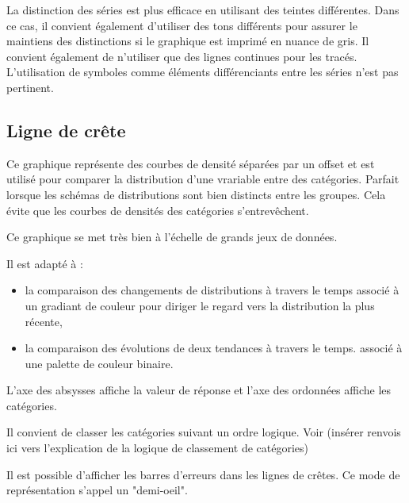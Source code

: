 \documentclass[a4paper,12pt]{article}
\begin{document}
\begin{multicols}{2}
La distinction des séries est plus efficace en utilisant des teintes différentes. Dans ce cas, il convient également d'utiliser des tons différents pour assurer le maintiens des distinctions si le graphique est imprimé en nuance de gris. \autocite{stephenfewComponentlevelGraphDesign2012}
Il convient également de n'utiliser que des lignes continues pour les tracés. \autocite{stephenfewComponentlevelGraphDesign2012}
L'utilisation de symboles comme éléments différenciants entre les séries n'est pas pertinent. \autocite{stephenfewComponentlevelGraphDesign2012}
\subsection*{Ligne de crête}
\label{sec:orgbbec5df}
Ce graphique représente des courbes de densité séparées par un offset et est utilisé pour comparer la distribution d'une vrariable entre des catégories. \autocite{wilkeVisualizingManyDistributions2019} Parfait lorsque les schémas de distributions sont bien distincts entre les groupes. \autocite{mikeyiHowChooseRight2020} Cela évite que les courbes de densités des catégories s'entrevêchent.\autocite{jonathanschwabishDistribution2021}

Ce graphique se met très bien à l'échelle de grands jeux de données. \autocite{wilkeVisualizingManyDistributions2019}

Il est adapté à :
\begin{itemize}
\item la comparaison des changements de distributions à travers le temps \autocite{wilkeDirectoryVisualizations2019} associé à un gradiant de couleur pour diriger le regard vers la distribution la plus récente, \autocite{jonathanschwabishDistribution2021}
\item la comparaison des évolutions de deux tendances à travers le temps. \autocite{wilkeVisualizingManyDistributions2019} associé à une palette de couleur binaire.
\end{itemize}

L'axe des absysses affiche la valeur de réponse et l'axe des ordonnées affiche les catégories. \autocite{wilkeVisualizingManyDistributions2019}

Il convient de classer les catégories suivant un ordre logique. \autocite{jonathanschwabishDistribution2021} Voir (insérer renvois ici vers l'explication de la logique de classement de catégories)

Il est possible d'afficher les barres d'erreurs dans les lignes de crêtes. Ce mode de représentation s'appel un "demi-oeil". \autocite{wilkeVisualizingUncertainty2019}


\end{multicols}
\end{document}
